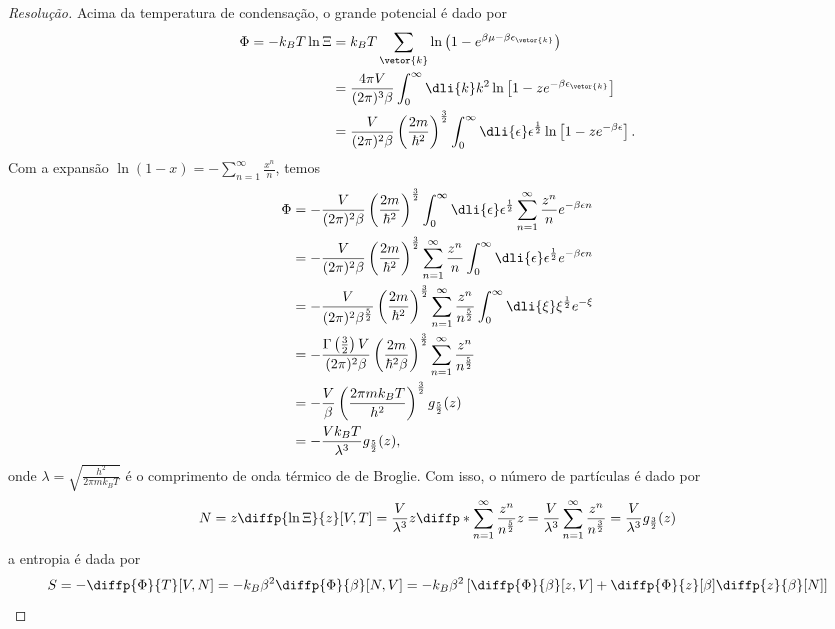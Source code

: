\begin{proof}[Resolução]
    Acima da temperatura de condensação, o grande potencial é dado por
    \begin{align*}
        \Phi = -k_B T \ln\Xi &= k_B T \sum_{\vetor{k}} \ln\left(1 - e^{\beta \mu -\beta \epsilon_{\vetor{k}}}\right)\\
                             &= \frac{4\pi V}{(2\pi)^3\beta} \int_{0}^\infty\dli{k} k^2\ln\left[1 - z e^{-\beta \epsilon_{\vetor{k}}}\right]\\
                             &= \frac{V}{(2\pi)^2 \beta} \left(\frac{2m}{\hbar^2}\right)^{\frac32}\int_0^\infty \dli{\epsilon} \epsilon^{\frac12} \ln\left[1 - z e^{- \beta \epsilon}\right].
    \end{align*}
    Com a expansão \(\ln(1 - x) = - \sum_{n = 1}^\infty \frac{x^n}{n}\), temos
    \begin{align*}
        \Phi &= -\frac{V}{(2\pi)^2 \beta} \left(\frac{2 m}{\hbar^2}\right)^{\frac32} \int_0^\infty \dli{\epsilon} \epsilon^{\frac12} \sum_{n = 1}^\infty \frac{z^n}{n}  e^{- \beta \epsilon n}\\
             &= - \frac{V}{(2\pi)^2 \beta} \left(\frac{2m}{\hbar^2}\right)^{\frac32} \sum_{n = 1}^\infty \frac{z^n}{n} \int_0^\infty \dli{\epsilon} \epsilon^{\frac12} e^{-\beta \epsilon n}\\
             &= - \frac{V}{(2\pi)^2 \beta^{\frac52}} \left(\frac{2m}{\hbar^2}\right)^{\frac32} \sum_{n = 1}^\infty \frac{z^n}{n^{\frac52}} \int_0^\infty \dli{\xi} \xi^{\frac12} e^{-\xi}\\
             &= -\frac{\Gamma\left(\frac32\right)V}{(2\pi)^2 \beta}\left(\frac{2m}{\hbar^2 \beta}\right)^{\frac32} \sum_{n = 1}^{\infty} \frac{z^n}{n^{\frac52}}\\
             &= - \frac{V}{\beta} \left(\frac{2\pi m k_BT}{h^2}\right)^{\frac32} g_{\frac52}(z)\\
             &= -\frac{V k_B T}{\lambda^3} g_{\frac52}(z),
    \end{align*}
    onde \(\lambda = \sqrt{\frac{h^2}{2\pi m k_B T}}\) é o comprimento de onda térmico de de Broglie. Com isso, o número de partículas é dado por
    \begin{equation*}
        N = z\diffp{\ln \Xi}{z}[V, T] = \frac{V}{\lambda^3} z \diffp*{\sum_{n=1}^\infty \frac{z^n}{n^{\frac52}}}{z} = \frac{V}{\lambda^3}\sum_{n = 1}^\infty \frac{z^n}{n^{\frac32}} = \frac{V}{\lambda^3}g_{\frac32}(z)
    \end{equation*}
    a entropia é dada por
    \begin{equation*}
        S = - \diffp{\Phi}{T}[V, N] = - k_B \beta^2 \diffp{\Phi}{\beta}[N, V] = -k_B \beta^2 \left[\diffp{\Phi}{\beta}[z, V] + \diffp{\Phi}{z}[\beta] \diffp{z}{\beta}[N]\right]
    \end{equation*}
\end{proof}
